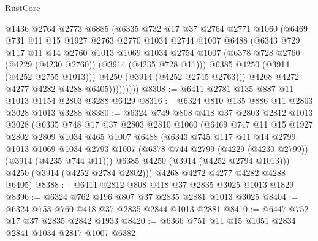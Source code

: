 \begin{lexlean}{RustCore}
\begin{coremodule}
                    @1436
                    @2764
                    @2773
                    @6885
                    (@6335
                      @732
                      @17
                      @37
                      @2764
                      @2771
                      @1060
                      (@6469
                        @731
                        @11
                        @15
                        @1927
                        @2763
                        @2770
                        @1034
                        @2744
                        @1007
                        @6488
                        (@6343
                          @729
                          @117
                          @11
                          @14
                          @2760
                          @1013
                          @1069
                          @1034
                          @2754
                          @1007
                          (@6378 @728 @2760 (@4229 (@4230 @2760)) (@3914 (@4235 @728 @11)))
                          @6385
                          @4250
                          (@3914 (@4252 @2755 @1013)))
                        @4250
                        (@3914 (@4252 @2745 @2763)))
                      @4268
                      @4272
                      @4277
                      @4282
                      @4288
                      @6405)))))))))
@8308 := @6411 @2781 @135 @887 @11 @1013 @1154 @2803 @3288 @6429
@8316 := @6324 @810 @135 @886 @11 @2803 @3028 @1013 @3288
@8380 := @6324
    @749
    @808
    @418
    @37
    @2803
    @2812
    @1013
    @3028
    (@6335
      @748
      @17
      @37
      @2803
      @2810
      @1060
      (@6469
        @747
        @11
        @15
        @1927
        @2802
        @2809
        @1034
        @465
        @1007
        @6488
        (@6343
          @745
          @117
          @11
          @14
          @2799
          @1013
          @1069
          @1034
          @2793
          @1007
          (@6378 @744 @2799 (@4229 (@4230 @2799)) (@3914 (@4235 @744 @11)))
          @6385
          @4250
          (@3914 (@4252 @2794 @1013)))
        @4250
        (@3914 (@4252 @2784 @2802)))
      @4268
      @4272
      @4277
      @4282
      @4288
      @6405)
@8388 := @6411 @2812 @808 @418 @37 @2835 @3025 @1013 @1829
@8396 := @6324 @762 @196 @807 @37 @2835 @2881 @1013 @3025
@8404 := @6324 @753 @760 @418 @37 @2835 @2844 @1013 @2881
@8410 := @6447 @752 @17 @37 @2835 @2842 @1933
@8420 := @6366 @751 @11 @15 @1051 @2834 @2841 @1034 @2817 @1007 @6382

\end{coremodule}
\end{lexlean}
